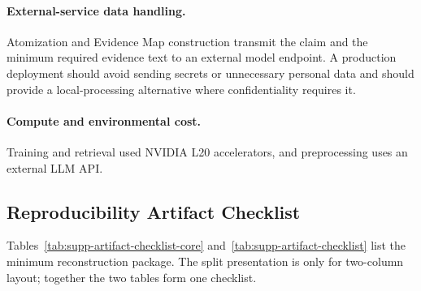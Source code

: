 \paragraph{External-service data handling.}
Atomization and Evidence Map construction transmit the claim and the
minimum required evidence text to an external model endpoint.  A production
deployment should avoid sending secrets or unnecessary personal data and
should provide a local-processing alternative where confidentiality
requires it.

\paragraph{Compute and environmental cost.}
Training and retrieval used NVIDIA L20 accelerators, and preprocessing uses
an external LLM API.

\subsection{Reproducibility Artifact Checklist}
\label{sec:supp-artifacts}

Tables~\ref{tab:supp-artifact-checklist-core}
and~\ref{tab:supp-artifact-checklist} list the minimum reconstruction
package.  The split presentation is only for two-column layout; together
the two tables form one checklist.

